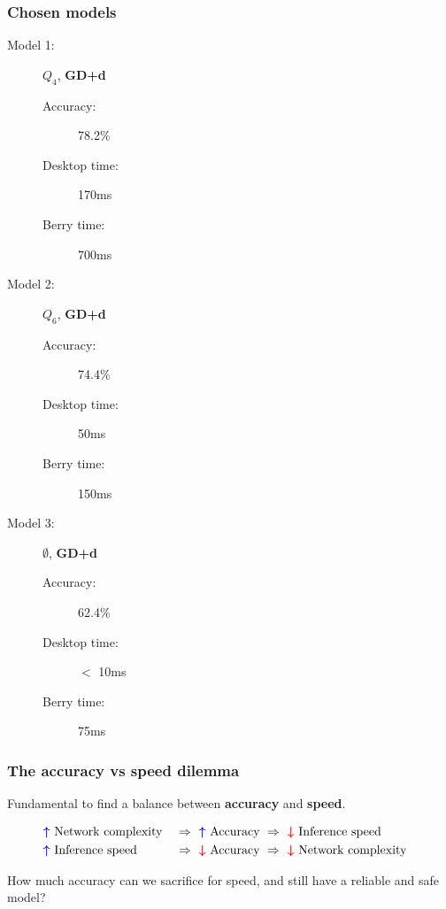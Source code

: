 \documentclass{beamer}
\renewcommand{\implies}{\Rightarrow}
\begin{document}
\begin{frame}
  \frametitle{Chosen models}

  \begin{description}
    \item[Model 1:] $Q_4$, \textbf{GD+d}
      \begin{description}
        \item[Accuracy:] 78.2\%
        \item[Desktop time:] 170ms
        \item[Berry time:] 700ms
      \end{description}
    \item[Model 2:] $Q_6$, \textbf{GD+d}
      \begin{description}
        \item[Accuracy:] 74.4\%
        \item[Desktop time:] 50ms
        \item[Berry time:] 150ms
      \end{description}
    \item[Model 3:] $\emptyset$, \textbf{GD+d}
      \begin{description}
        \item[Accuracy:] 62.4\%
        \item[Desktop time:] $<$ 10ms
        \item[Berry time:] 75ms
      \end{description}
  \end{description}
\end{frame}

\begin{frame}
  \frametitle{The accuracy vs speed dilemma}

  Fundamental to find a balance between \textbf{accuracy} and \textbf{speed}.

  \large
  \begin{align*}
    &\hspace{-0.30cm}\textcolor{blue}{\boldsymbol\uparrow}\text{ Network complexity }&\implies\text{ }
    \textcolor{blue}{\boldsymbol\uparrow}\text{ Accuracy }&\implies\text{ }
    \textcolor{red}{\boldsymbol\downarrow}\text{ Inference speed}\\
    &\hspace{-0.30cm}\textcolor{blue}{\boldsymbol\uparrow}\text{ Inference speed }&\implies\text{ }
    \textcolor{red}{\boldsymbol\downarrow}\text{ Accuracy }&\implies\text{ }
    \textcolor{red}{\boldsymbol\downarrow}\text{ Network complexity}\\
  \end{align*}

  \normalsize

  How much accuracy can we sacrifice for speed, and still have a reliable and safe model?
\end{frame}
\end{document}
